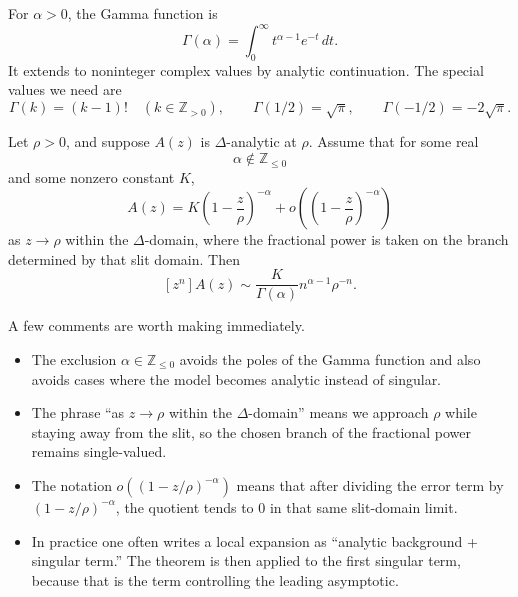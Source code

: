\begin{definition}
For $\alpha > 0$, the Gamma function is
\[
  \Gamma(\alpha) = \int_0^{\infty} t^{\alpha-1} e^{-t}\,dt.
\]
It extends to noninteger complex values by analytic continuation. The special values we need are
\[
  \Gamma(k) = (k-1)! \quad (k \in \mathbb{Z}_{>0}),
  \qquad
  \Gamma(1/2) = \sqrt{\pi},
  \qquad
  \Gamma(-1/2) = -2\sqrt{\pi}.
\]
\end{definition}

\begin{theorem}
\label{thm:transfer}
Let $\rho>0$, and suppose $A(z)$ is $\Delta$-analytic at $\rho$. Assume that for some real
\[
  \alpha \notin \mathbb{Z}_{\le 0}
\]
and some nonzero constant $K$,
\[
  A(z) = K\left(1-\frac{z}{\rho}\right)^{-\alpha} + o\!\left(\left(1-\frac{z}{\rho}\right)^{-\alpha}\right)
\]
as $z \to \rho$ within the $\Delta$-domain, where the fractional power is taken on the branch determined by that slit domain. Then
\[
  [z^n]A(z) \sim \frac{K}{\Gamma(\alpha)} n^{\alpha-1} \rho^{-n}.
\]
\end{theorem}

A few comments are worth making immediately.
\begin{itemize}
  \item The exclusion $\alpha \in \mathbb{Z}_{\le 0}$ avoids the poles of the Gamma function and also avoids cases where the model becomes analytic instead of singular.
  \item The phrase ``as $z \to \rho$ within the $\Delta$-domain'' means we approach $\rho$ while staying away from the slit, so the chosen branch of the fractional power remains single-valued.
  \item The notation $o((1-z/\rho)^{-\alpha})$ means that after dividing the error term by $(1-z/\rho)^{-\alpha}$, the quotient tends to $0$ in that same slit-domain limit.
  \item In practice one often writes a local expansion as ``analytic background + singular term.'' The theorem is then applied to the first singular term, because that is the term controlling the leading asymptotic.
\end{itemize}

